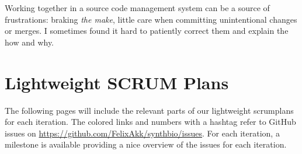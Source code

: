 \documentclass[a4paper]{article}
\begin{document}
Working together in a source code management system can be a source of frustrations: braking \textit{the make}, little care when committing unintentional changes or merges. I sometimes found it hard to patiently correct them and explain the how and why.


\section{Lightweight SCRUM Plans}
The following pages will include the relevant parts of our lightweight scrumplans for each iteration. The colored links and numbers with a hashtag refer to GitHub issues on \url{https://github.com/FelixAkk/synthbio/issues}. For each iteration, a milestone is available providing a nice overview of the issues for each iteration.










\end{document}
